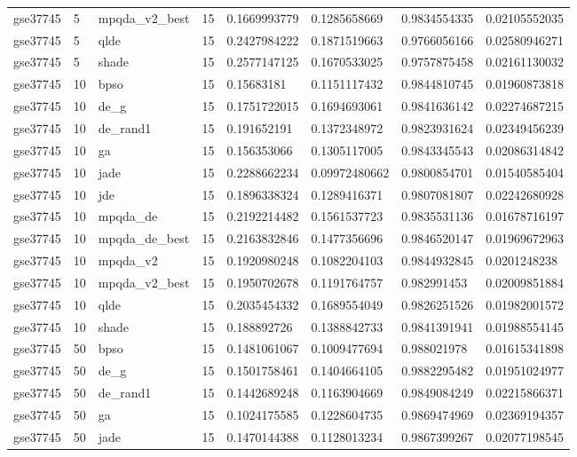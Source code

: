 \begin{table}[t]
\begin{tabular}{llllllll}
gse37745 & 5 & mpqda\_v2\_best & 15 & 0.1669993779 & 0.1285658669 & 0.9834554335 & 0.02105552035 \\
gse37745 & 5 & qlde & 15 & 0.2427984222 & 0.1871519663 & 0.9766056166 & 0.02580946271 \\
gse37745 & 5 & shade & 15 & 0.2577147125 & 0.1670533025 & 0.9757875458 & 0.02161130032 \\
gse37745 & 10 & bpso & 15 & 0.15683181 & 0.1151117432 & 0.9844810745 & 0.01960873818 \\
gse37745 & 10 & de\_g & 15 & 0.1751722015 & 0.1694693061 & 0.9841636142 & 0.02274687215 \\
gse37745 & 10 & de\_rand1 & 15 & 0.191652191 & 0.1372348972 & 0.9823931624 & 0.02349456239 \\
gse37745 & 10 & ga & 15 & 0.156353066 & 0.1305117005 & 0.9843345543 & 0.02086314842 \\
gse37745 & 10 & jade & 15 & 0.2288662234 & 0.09972480662 & 0.9800854701 & 0.01540585404 \\
gse37745 & 10 & jde & 15 & 0.1896338324 & 0.1289416371 & 0.9807081807 & 0.02242680928 \\
gse37745 & 10 & mpqda\_de & 15 & 0.2192214482 & 0.1561537723 & 0.9835531136 & 0.01678716197 \\
gse37745 & 10 & mpqda\_de\_best & 15 & 0.2163832846 & 0.1477356696 & 0.9846520147 & 0.01969672963 \\
gse37745 & 10 & mpqda\_v2 & 15 & 0.1920980248 & 0.1082204103 & 0.9844932845 & 0.0201248238 \\
gse37745 & 10 & mpqda\_v2\_best & 15 & 0.1950702678 & 0.1191764757 & 0.982991453 & 0.02009851884 \\
gse37745 & 10 & qlde & 15 & 0.2035454332 & 0.1689554049 & 0.9826251526 & 0.01982001572 \\
gse37745 & 10 & shade & 15 & 0.188892726 & 0.1388842733 & 0.9841391941 & 0.01988554145 \\
gse37745 & 50 & bpso & 15 & 0.1481061067 & 0.1009477694 & 0.988021978 & 0.01615341898 \\
gse37745 & 50 & de\_g & 15 & 0.1501758461 & 0.1404664105 & 0.9882295482 & 0.01951024977 \\
gse37745 & 50 & de\_rand1 & 15 & 0.1442689248 & 0.1163904669 & 0.9849084249 & 0.02215866371 \\
gse37745 & 50 & ga & 15 & 0.1024175585 & 0.1228604735 & 0.9869474969 & 0.02369194357 \\
gse37745 & 50 & jade & 15 & 0.1470144388 & 0.1128013234 & 0.9867399267 & 0.02077198545 \\

\end{tabular}
\end{table}
